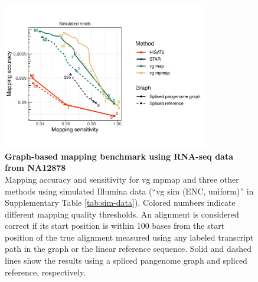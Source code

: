 \documentclass[11pt]{ucthesis}
\begin{document}
\begin{figure}[H]
\ssp
\begin{center}
\includegraphics[width=0.8\textwidth]{mpmapfigures/figureS2.pdf}
\caption{\textbf{Graph-based mapping benchmark using RNA-seq data from NA12878} \\
Mapping accuracy and sensitivity for vg mpmap and three other methods using simulated Illumina data (``vg sim (ENC, uniform)'' in Supplementary Table \ref{tab:sim-data}). Colored numbers indicate different mapping quality thresholds. An alignment is considered correct if its start position is within 100 bases from the start position of the true alignment measured using any labeled transcript path in the graph or the linear reference sequence. Solid and dashed lines show the results using a spliced pangenome graph and spliced reference, respectively. 
} \label{fig:mapping-gampcompare}
\end{center}
\end{figure}
\end{document}
